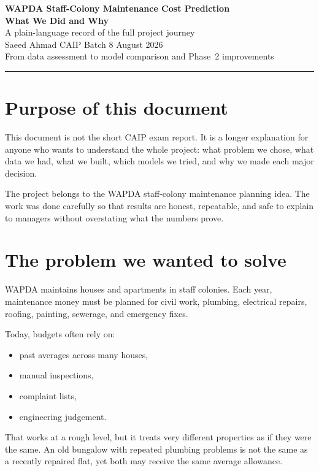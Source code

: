 \documentclass[11pt,a4paper]{article}
\begin{document}
\begin{center}
{\large\bfseries\color{phaseblue} WAPDA Staff-Colony Maintenance Cost Prediction}\\[0.4em]
{\LARGE\bfseries What We Did and Why}\\[0.5em]
{\large A plain-language record of the full project journey}\\[0.6em]
{\normalsize Saeed Ahmad \textperiodcentered{} CAIP Batch 8 \textperiodcentered{} August 2026}\\[0.3em]
{\small From data assessment to model comparison and Phase~2 improvements}
\end{center}

\vspace{0.5em}
\noindent\rule{\textwidth}{0.5pt}

\section*{Purpose of this document}
This document is not the short CAIP exam report. It is a longer explanation for anyone who wants to understand the whole project: what problem we chose, what data we had, what we built, which models we tried, and why we made each major decision.

The project belongs to the WAPDA staff-colony maintenance planning idea. The work was done carefully so that results are honest, repeatable, and safe to explain to managers without overstating what the numbers prove.

\section{The problem we wanted to solve}

WAPDA maintains houses and apartments in staff colonies. Each year, maintenance money must be planned for civil work, plumbing, electrical repairs, roofing, painting, sewerage, and emergency fixes.

Today, budgets often rely on:
\begin{itemize}
  \item past averages across many houses,
  \item manual inspections,
  \item complaint lists,
  \item engineering judgement.
\end{itemize}

That works at a rough level, but it treats very different properties as if they were the same. An old bungalow with repeated plumbing problems is not the same as a recently repaired flat, yet both may receive the same average allowance.
\end{document}
